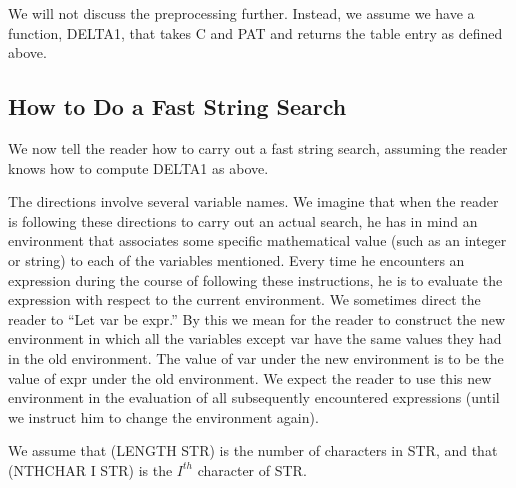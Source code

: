 \documentclass[10pt]{book}
\begin{document}
We will not discuss the preprocessing
further.  Instead, we  assume we have a function, DELTA1, that
takes C and PAT and returns the table entry as defined above.

\subsection{How to Do a Fast String Search}
\label{SSSENGLISHFSTRPOS}
We now tell the reader how to carry
out a fast string search, assuming the reader knows how to compute
DELTA1 as above.

The directions  involve several variable names.
We imagine that when the reader is following these directions to
carry out an actual search, he has in mind an environment
that associates some specific mathematical
value (such as an integer or string) to each of the variables
mentioned.  Every time he encounters an expression during the course
of following these instructions, he is to evaluate the expression with
respect to the current environment.   We sometimes direct the reader
to  ``Let var be expr.''  By this we mean for the reader
to construct the new environment in which all the variables
except var have the same values they had in the old environment.
The value of var under the new environment is to be the
value of expr under the old environment.  We expect
the reader to use this new environment in the evaluation of all subsequently
encountered expressions  (until we instruct him to change the environment again).

We  assume that (LENGTH STR) is the number of characters in
STR, and that (NTHCHAR I STR) is the $I^{th}$ character of STR.
\end{document}
